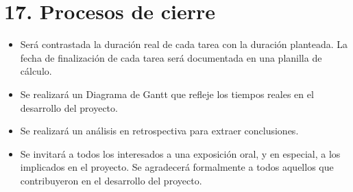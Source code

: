 \documentclass[11pt]{charter}
\begin{document}
\section{17. Procesos de cierre}    
\label{sec:cierre}



\begin{itemize}
	\item Será contrastada la duración real de cada tarea con la duración planteada. La fecha de finalización de cada tarea será documentada en una planilla de cálculo.
	\item Se realizará un Diagrama de Gantt que refleje los tiempos reales en el desarrollo del proyecto.
	\item Se realizará un análisis en retrospectiva para extraer conclusiones.
	\item Se invitará a todos los interesados a una exposición oral, y en especial, a los implicados en el proyecto. Se agradecerá formalmente a todos aquellos que contribuyeron en el desarrollo del proyecto. 
\end{itemize}
\end{document}
